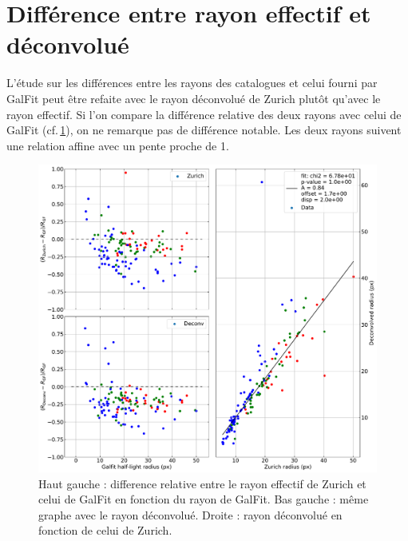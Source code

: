 \documentclass[10pt,a4paper,notitlepage]{article}
\begin{document}
    \section{Différence entre rayon effectif et déconvolué}
    
    L'étude sur les différences entre les rayons des catalogues et celui fourni par GalFit peut être refaite avec le rayon déconvolué de Zurich plutôt qu'avec le rayon effectif. Si l'on compare la différence relative des deux rayons avec celui de GalFit (cf.\,\ref{fig:comp_Zurich_deconvolue}), on ne remarque pas de différence notable. Les deux rayons suivent une relation affine avec un pente proche de 1.
    
    \begin{figure}[h]
        \centering
	    \includegraphics[width=0.66\linewidth]{plotsWithColourCoding/zurichAndDeconvolvedRadii_against_Galfit_colourCodedWithCassataType.pdf}	
	    \caption{Haut gauche : difference relative entre le rayon effectif de Zurich et celui de GalFit en fonction du rayon de GalFit. Bas gauche : même graphe avec le rayon déconvolué. Droite : rayon déconvolué en fonction de celui de Zurich.}
	     \label{fig:comp_Zurich_deconvolue}
    \end{figure}    
    
    
   
    
\end{document}
